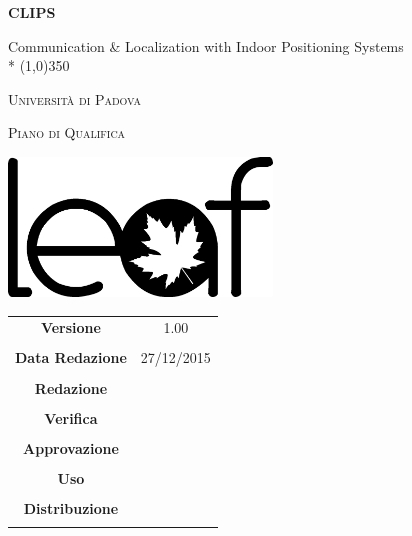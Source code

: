 \documentclass{article}
\begin{document}
	\pagestyle{myfront}
	\begin{titlepage}
		\centering
		{\huge\bfseries CLIPS\par}
		Communication \& Localization with Indoor Positioning Systems \\*
		\line(1,0){350} \\
		{\scshape\LARGE Università di Padova \par}
		\vspace{1cm}
		{\scshape\Large Piano di Qualifica\par}
		\vspace{2cm}
		\begin{center}
		{\includegraphics[height=10em]{logoNoSfondo} \par}
		\end{center}
		\vfill \vfill
		\begin{tabular}{c|c}
			{\hfill \textbf{Versione}} & 1.00\\ \\
			{\hfill\textbf{Data Redazione}} & 27/12/2015  \\ \\
			{\hfill\textbf{Redazione}} &  \\ \\
			{\hfill\textbf{Verifica}} &  \\ \\
			{\hfill\textbf{Approvazione}} &  \\ \\
			{\hfill\textbf{Uso}} & \\ \\
			{\hfill\textbf{Distribuzione}} & \\ \\
		\end{tabular}
	\end{titlepage}
	
	\newpage
	
	\tableofcontents
	
	\newpage
	
	\listoftables
	
	\label{LastFrontPage}
	\newpage
	\pagestyle{mymain}
	
\newpage
	
\newpage
	
\newpage
	
\newpage
	
\newpage
	
\label{LastPage}
\end{document}
